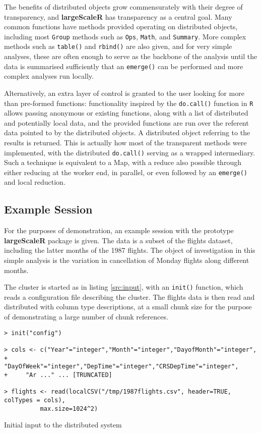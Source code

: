 The benefits of distributed objects grow commensurately with their degree of transparency, and \textbf{largeScaleR} has transparency as a central goal.
Many common functions have methods provided operating on distributed objects, including most \texttt{Group} methods such as \texttt{Ops}, \texttt{Math}, and \texttt{Summary}.
More complex methods such as \texttt{table()} and \texttt{rbind()} are also given, and for very simple analyses, these are often enough to serve as the backbone of the analysis until the data is summarised sufficiently that an \texttt{emerge()} can be performed and more complex analyses run locally.

Alternatively, an extra layer of control is granted to the user looking for more than pre-formed functions:
functionality inspired by the \texttt{do.call()} function in \texttt{R} allows passing anonymous or existing functions, along with a list of distributed and potentially local data, and the provided functions are run over the referent data pointed to by the distributed objects.
A distributed object referring to the results is returned.
This is actually how most of the transparent methods were implemented, with the distributed \texttt{do.call()} serving as a wrapped intermediary.
Such a technique is equivalent to a Map, with a reduce also possible through either reducing at the worker end, in parallel, or even followed by an \texttt{emerge()} and local reduction\cite{mccool2012structured}.

\subsection{Example Session}

For the purposes of demonstration, an example session with the prototype \textbf{largeScaleR} package is given.
The data is a subset of the flights dataset, including the latter months of the 1987 flights.
The object of investigation in this simple analysis is the variation in cancellation of Monday flights along different months.

The cluster is started as in listing \ref{src:input}, with an \texttt{init()} function, which reads a configuration file describing the cluster.
The flights data is then read and distributed with column type descriptions, at a small chunk size for the purpose of demonstrating a large number of chunk references.
\begin{listing}%
\begin{verbatim}
> init("config")

> cols <- c("Year"="integer","Month"="integer","DayofMonth"="integer",
+ 	  "DayOfWeek"="integer","DepTime"="integer","CRSDepTime"="integer",
+ 	  "Ar ..." ... [TRUNCATED]

> flights <- read(localCSV("/tmp/1987flights.csv", header=TRUE, colTypes = cols),
		  max.size=1024^2)
\end{verbatim}
\caption{Initial input to the distributed system}\label{src:input}
\end{listing}

